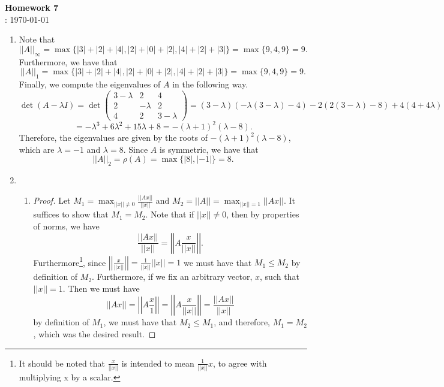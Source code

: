 \documentclass[12pt]{article}
\title{}
\author{Josh Morales}
\date{\today}
\begin{document}
\pagestyle{fancy}
\begin{center}
\textbf{\Large Homework 7} \\
: \today
\end{center}
\begin{enumerate}[leftmargin=0em]
    \item
    Note that 
    \[{||A||}_{\infty} = \max\{|3|+|2|+|4|,|2|+|0|+|2|, |4|+|2|+|3|\}= \max\{9,4,9\} = 9.\]
    Furthermore, we have that
    \[{||A||}_{1} = \max\{|3|+|2|+|4|, |2|+|0|+|2|, |4|+|2|+|3|\}= \max\{9,4,9\} = 9.\]
    Finally, we compute the eigenvalues of $A$ in the following way.
    \[\det(A-\lambda I)= 
    \det
    \begin{pmatrix}
        3-\lambda & 2 & 4\\
        2 & -\lambda & 2\\
        4 & 2 & 3-\lambda
    \end{pmatrix} = (3-\lambda)(-\lambda(3-\lambda)-4)-2(2(3-\lambda)-8)+4(4+4\lambda)\]
    \[= -\lambda^3+6\lambda^2+15\lambda+8=-{(\lambda+1)}^2(\lambda-8).\]
    Therefore, the eigenvalues are given by the roots of $-{(\lambda+1)}^2(\lambda-8)$, which are $\lambda=-1$ and $\lambda=8$. 
    Since $A$ is symmetric, we have that
    \[{||A||}_{2} = \rho(A) = \max\{|8|, |-1|\} = 8.\]


    \item 
    \begin{enumerate}[leftmargin=!]
        \item 
        \begin{proof}
            Let $M_1 = \max_{||x||\neq 0} \frac{||Ax||}{||x||}$ and $M_2 = ||A|| = \max_{||x|| = 1} ||Ax||$. It suffices to show that $M_1=M_2$. Note that if $||x||\neq 0$, then by properties of norms, we have
            \[\frac{||Ax||}{||x||}= \left|\left|A\frac{x}{||x||}\right|\right|.\]
            Furthermore\footnote{It should be noted that $\frac{x}{||x||}$ is intended to mean $\frac{1}{||x||}x$, to agree with multiplying x by a scalar.}, since $\left|\left|\frac{x}{||x||}\right|\right|= \frac{1}{||x||}||x|| = 1$
            we must have that $M_1 \leq M_2$ by definition of $M_2$. Furthermore, if we fix an arbitrary vector, $x$, such that $||x||=1$. Then we must have
            \[||Ax|| = \left|\left|A\frac{x}{1}\right|\right|=\left|\left|A\frac{x}{||x||}\right|\right|=\frac{||Ax||}{||x||}\]
            by definition of $M_1$, we must have that $M_2\leq M_1$, and therefore, $M_1=M_2$, which was the desired result.
        \end{proof}
        

\end{enumerate}
\end{enumerate}
\end{document}
